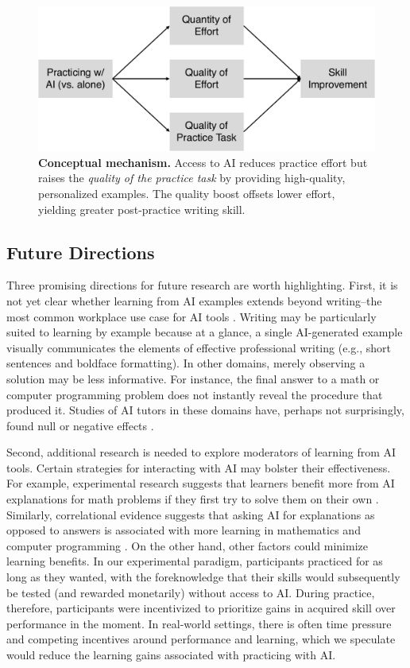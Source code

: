 \documentclass[11pt]{report}
\begin{document}
\begin{mainf}
\begin{figure}
    \centering
    \includegraphics[width=\linewidth]{f10.pdf}
\caption{\textbf{Conceptual mechanism.} Access to AI reduces practice effort but raises the \emph{quality of the practice task} by providing high-quality, personalized examples. The quality boost offsets lower effort, yielding greater post-practice writing skill. }    \label{fig:arrows}
\end{figure}

\subsection*{Future Directions}
Three promising directions for future research are worth highlighting.
First, it is not yet clear whether learning from AI examples extends beyond writing--the most common workplace use case for AI tools \cite{bick2024rapid}. Writing may be particularly suited to learning by example because at a glance, a single AI-generated example visually communicates the elements of effective professional writing (e.g., short sentences and boldface formatting). 
    In other domains, merely observing a solution may be less informative. For instance, the final answer to a math or computer programming problem does not instantly reveal the procedure that produced it. Studies of AI tutors in these domains have, perhaps not surprisingly, found null or negative effects \cite{bastani2024, nie2024gpt}.    

Second, additional research is needed to explore moderators of learning from AI tools. 
    Certain strategies for interacting with AI may bolster their effectiveness.
    For example, experimental research suggests that learners benefit more from AI explanations for math problems if they first try to solve them on their own \cite{kumar2023}. 
    Similarly, correlational evidence suggests that asking AI for explanations as opposed to answers is associated with more learning in mathematics \cite{bastani2024} and computer programming \cite{lehmann2024ai}.
    On the other hand, other factors could minimize learning benefits.
    In our experimental paradigm, participants practiced for as long as they wanted, with the foreknowledge that their skills would subsequently be tested (and rewarded monetarily) without access to AI. 
    During practice, therefore, participants were incentivized to prioritize gains in acquired skill over performance in the moment. 
    In real-world settings, there is often time pressure and competing incentives around performance and learning, which we speculate would reduce the learning gains associated with practicing with AI.


\end{mainf}
\end{document}
